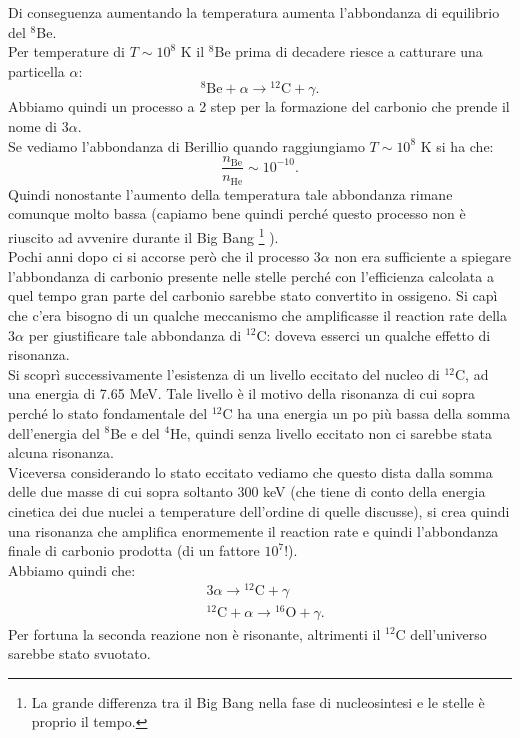 Di conseguenza aumentando la temperatura aumenta l'abbondanza di equilibrio del ${}^{8}$Be. \\ 
Per temperature di $T\sim 10^8$ K il ${}^{8}$Be prima di decadere riesce a catturare una particella $\alpha$:
\[
    {}^{8}\text{Be} + \alpha  \to {}^{12}\text{C}+\gamma
.\] 
Abbiamo quindi un processo a 2 step per la formazione del carbonio che prende il nome di $3\alpha$. \\
Se vediamo l'abbondanza di Berillio quando raggiungiamo $T\sim 10^8$ K si ha che:
\[
    \frac{n_\text{Be}}{n_\text{He} } \sim 10^{-10}
.\] 
Quindi nonostante l'aumento della temperatura tale abbondanza rimane comunque molto bassa (capiamo bene quindi perché questo processo non è riuscito ad avvenire durante il Big Bang
\footnote{La grande differenza tra il Big Bang nella fase di nucleosintesi e le stelle è proprio il tempo.}
). \\
Pochi anni dopo ci si accorse però che il processo $3\alpha$ non era sufficiente a spiegare l'abbondanza di carbonio presente nelle stelle perché con l'efficienza calcolata a quel tempo gran parte del carbonio sarebbe stato convertito in ossigeno. Si capì che c'era bisogno di un qualche meccanismo che amplificasse il reaction rate della $3\alpha$ per giustificare tale abbondanza di ${}^{12}$C: doveva esserci un qualche effetto di risonanza.\\
Si scoprì successivamente l'esistenza di un livello eccitato del nucleo di ${}^{12}$C, ad una energia di 7.65 MeV. Tale livello è il motivo della risonanza di cui sopra perché lo stato fondamentale del ${}^{12}$C ha una energia un po più bassa della somma dell'energia del ${}^{8}$Be e del ${}^{4}$He, quindi senza livello eccitato non ci sarebbe stata alcuna risonanza. \\
Viceversa considerando lo stato eccitato vediamo che questo dista dalla somma delle due masse di cui sopra soltanto 300 keV (che tiene di conto della energia cinetica dei due nuclei a temperature dell'ordine di quelle discusse), si crea quindi una risonanza che amplifica enormemente il reaction rate e quindi l'abbondanza finale di carbonio prodotta (di un fattore $10^7$!). \\
Abbiamo quindi che:
\[\begin{aligned}
    &3\alpha  \to {}^{12}\text{C} + \gamma\\
    &{}^{12}\text{C} + \alpha  \to {}^{16}\text{O} + \gamma
.\end{aligned}\]
Per fortuna la seconda reazione non è risonante, altrimenti il ${}^{12}$C dell'universo sarebbe stato svuotato.\\
